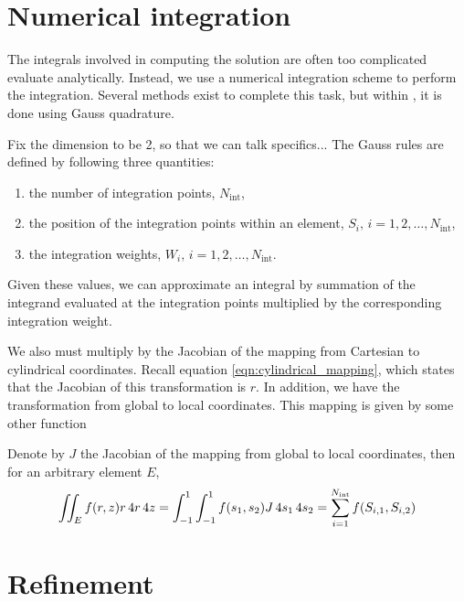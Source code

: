 
\section{Numerical integration}

The integrals involved in computing the solution are often too complicated evaluate analytically.
Instead, we use a numerical integration scheme to perform the integration.
Several methods exist to complete this task, but within \oomph, it is done using Gauss quadrature.

\cite{oomph}
Fix the dimension to be 2, so that we can talk specifics...
The Gauss rules are defined by following three quantities:
\begin{enumerate}
	\item the number of integration points, $N_\mathrm{int}$,
	\item the position of the integration points within an element, $S_i, \, i=1,2,\ldots,N_\mathrm{int}$,
	\item the integration weights, $W_i, \, i=1,2,\ldots,N_\mathrm{int}$.
\end{enumerate} 
Given these values, we can approximate an integral by summation of the integrand evaluated at the integration points multiplied by the corresponding integration weight.

We also must multiply by the Jacobian of the mapping from Cartesian to cylindrical coordinates.
Recall equation \eqref{eqn:cylindrical_mapping}, which states that the Jacobian of this transformation is $r$.
In addition, we have the transformation from global to local coordinates.
This mapping is given by some other function

Denote by $J$ the Jacobian of the mapping from global to local coordinates, then for an arbitrary element $E$, 
\begin{align}
	\iint_E f(r,z) r \,4 r \,4 z = \int_{-1}^1 \int_{-1}^1  f(s_1, s_2) J \, 4 s_1 \, 4 s_2 = \sum_{i=1}^{N_\mathrm{int}} f(S_{i,1},S_{i,2}) 
\end{align}







\section{Refinement}

